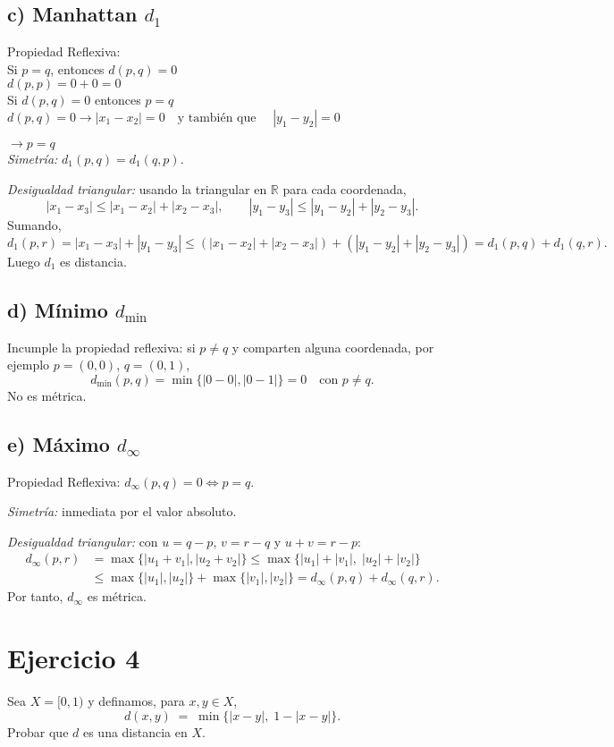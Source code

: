 \documentclass[12pt]{article}
\begin{document}
\subsection*{c) Manhattan $d_1$}
Propiedad Reflexiva:\\
Si $p=q$, entonces $d(p,q)=0$\\
$d(p,p) = 0 + 0 = 0$\\

Si $d(p,q)=0$ entonces $p=q$  \\
$d(p,q)=0 \rightarrow |x_1-x_2| = 0 \quad \text{y también que } \quad |y_1-y_2| = 0$

$\rightarrow p = q$ \\

\emph{Simetría:} $d_1(p,q)=d_1(q,p)$.

\emph{Desigualdad triangular:} usando la triangular en $\mathbb{R}$ para cada coordenada,
\[
|x_1-x_3|\le |x_1-x_2|+|x_2-x_3|,
\qquad
|y_1-y_3|\le |y_1-y_2|+|y_2-y_3|.
\]
Sumando,
\[
d_1(p,r)=|x_1-x_3|+|y_1-y_3|
\le (|x_1-x_2|+|x_2-x_3|)+(|y_1-y_2|+|y_2-y_3|)
= d_1(p,q)+d_1(q,r).
\]
Luego $d_1$ es distancia.

\subsection*{d) Mínimo $d_{\min}$}
Incumple la propiedad reflexiva: si $p\neq q$ y comparten alguna coordenada,
por ejemplo $p=(0,0)$, $q=(0,1)$,
\[
d_{\min}(p,q)=\min\{|0-0|,|0-1|\}=0\quad\text{con }p\neq q.
\]
No es métrica.

\subsection*{e) Máximo $d_\infty$}
Propiedad Reflexiva:
$d_\infty(p,q)=0\iff p=q$.

\emph{Simetría:} inmediata por el valor absoluto.

\emph{Desigualdad triangular:} con $u=q-p$, $v=r-q$ y $u+v=r-p$:
\[
\begin{aligned}
d_\infty(p,r)
&=\max\{|u_1+v_1|,|u_2+v_2|\}
\le \max\{|u_1|+|v_1|,\;|u_2|+|v_2|\}\\
&\le \max\{|u_1|,|u_2|\}+\max\{|v_1|,|v_2|\}
= d_\infty(p,q)+d_\infty(q,r).
\end{aligned}
\]
Por tanto, $d_\infty$ es métrica.


\section*{Ejercicio 4}
Sea $X=[0,1)$ y definamos, para $x,y\in X$,
\[
d(x,y)\;=\;\min\{|x-y|,\;1-|x-y|\}.
\]
Probar que $d$ es una distancia en $X$.
\end{document}
